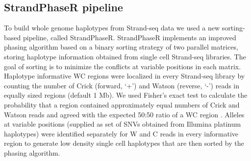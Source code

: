 % 
\subsection{StrandPhaseR pipeline}
	To build whole genome haplotypes from Strand-seq data we used a new sorting-based pipeline, called StrandPhaseR. 
	StrandPhaseR implements an improved phasing algorithm based on a binary sorting strategy of two parallel matrices, storing haplotype information obtained from single cell Strand-seq libraries.
	The goal of sorting is to minimize the conflicts at variable positions in each matrix.
	Haplotype informative WC regions were localized in every Strand-seq library  by counting the number of Crick (forward, ‘+’) and Watson (reverse, ‘-’) reads in equally sized regions (default 1 Mb). 
	We used Fisher's exact test to calculate the probability that a region contained approximately equal numbers of Crick and Watson reads and agreed with the expected 50:50 ratio of a WC region \citep{sanders2016characterizing}. 
	Alleles at variable positions (supplied as set of SNVs obtained from Illumina platinum haplotypes) were identified separately for W and C reads in every informative region to generate low density single cell haplotypes 
	that are then sorted by the phasing algorithm. 
 
	
